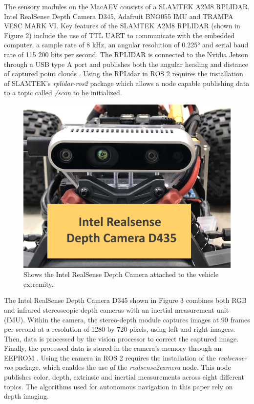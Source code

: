 \documentclass[conference]{IEEEtran}
\begin{document}
The sensory modules on the MacAEV consists of a SLAMTEK A2M8 RPLIDAR, Intel RealSense Depth Camera D345, Adafruit BNO055 IMU and TRAMPA VESC MARK VI. Key features of the SLAMTEK A2M8 RPLIDAR (shown in Figure 2) include the use of TTL UART to communicate with the embedded computer, a sample rate of 8 kHz, an angular resolution of \ang{0.225} and serial baud rate of 115 200 bits per second. The RPLIDAR is connected to the Nvidia Jetson through a USB type A port and publishes both the angular heading and distance of captured point clouds \cite{b6}. Using the RPLidar in ROS 2 requires the installation of SLAMTEK's \textit{rplidar-ros2} package which allows a node capable publishing data to a topic called \textit{/scan} to be initialized.

\begin{figure}
    \centering
    \includegraphics[scale=0.25]{realsense_diagram.png}
    \caption{Shows the Intel RealSense Depth Camera attached to the vehicle extremity.}
    \label{Figure 3}
\end{figure}


The Intel RealSense Depth Camera D345 shown in Figure 3 combines both RGB and infrared stereoscopic depth cameras with an inertial measurement unit (IMU). Within the camera, the stereo-depth module captures images at 90 frames per second at a resolution of 1280 by 720 pixels, using left and right imagers. Then, data is processed by the vision processor to correct the captured image. Finally, the processed data is stored in the camera's memory through an EEPROM \cite{b7}. Using the camera in ROS 2 requires the installation of the \textit{realsense-ros} package, which enables the use of the \textit{realsense2\textunderscore camera} node. This node publishes color, depth, extrinsic and inertial measurements across eight different topics. The algorithms used for autonomous navigation in this paper rely on depth imaging. 
\end{document}
